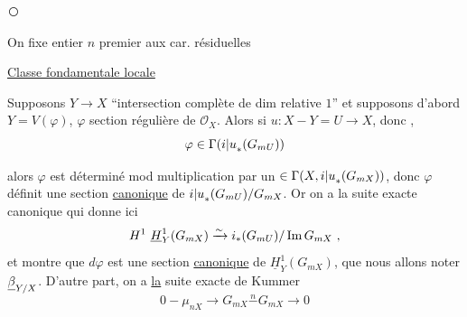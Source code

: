 \textcircled{}

On fixe entier $n$ premier aux car. résiduelles

\uline{Classe fondamentale locale}

Supposons $Y\longrightarrow X$ ``intersection complète de dim relative $1$'' et supposons d'abord $Y=V(\varphi)$, $\varphi$ section régulière de $\mathcal O_X$. Alors si $u:X-Y=U\to X$, donc ,
\[
\varphi\in\Gamma(\relax{i|u}_*(G_{mU}))
\]

 alors $\varphi$ est déterminé  mod multiplication par un $\in\Gamma(X,\relax{i|u}_*(G_{mX}))$, donc  $\varphi$ définit une section \deleted{$\varphi\in$} \uline{canonique} de  $\relax{i|u}_*(G_{mU})/G_{mX}$. Or on a la suite exacte canonique
qui donne ici
\[
\deleted{\unsure{H^1}}\ \underline H^1_Y(G_{mX})\xrightarrow{\sim}i_*(G_{mU})/\operatorname{Im}G_{mX}\ ,
\]
et montre que $d\varphi$ est une section \uline{canonique} de $\underline H^1_Y(G_{mX})$, que nous allons noter  $\underline{\relax{\beta}}_{Y/X}$. D'autre part, on a \uline{la} suite exacte de Kummer
\[
0\mathbin{-}\mu_{nX}\longrightarrow G_{mX}\mathrel{\overset{n}{-}}G_{mX}\longrightarrow0
\]
